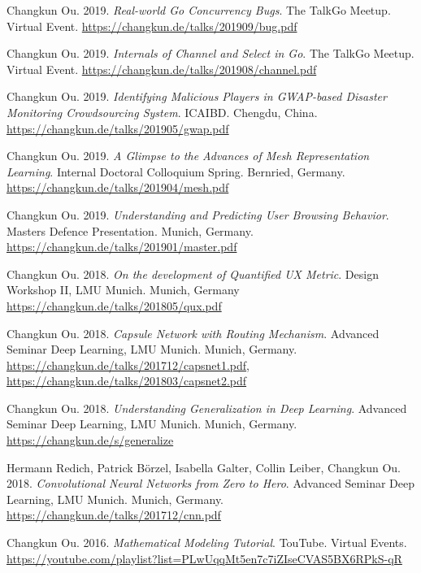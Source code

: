    \item{
      Changkun Ou. 2019.
      \emph{Real-world Go Concurrency Bugs}.
      The TalkGo Meetup. Virtual Event.
      \url{https://changkun.de/talks/201909/bug.pdf}
    }
    \item{
      Changkun Ou. 2019.
      \emph{Internals of Channel and Select in Go}.
      The TalkGo Meetup. Virtual Event.
      \url{https://changkun.de/talks/201908/channel.pdf}
    }
    \item{
      Changkun Ou. 2019.
      \emph{Identifying Malicious Players in GWAP-based Disaster Monitoring Crowdsourcing System}.
      ICAIBD. Chengdu, China.
      \url{https://changkun.de/talks/201905/gwap.pdf}
    }
    \item{
      Changkun Ou. 2019.
      \emph{A Glimpse to the Advances of Mesh Representation Learning}.
      Internal Doctoral Colloquium Spring. Bernried, Germany.
      \url{https://changkun.de/talks/201904/mesh.pdf}
    }
    \item{
      Changkun Ou. 2019.
      \emph{Understanding and Predicting User Browsing Behavior}.
      Masters Defence Presentation. Munich, Germany.
      \url{https://changkun.de/talks/201901/master.pdf}
    }
    \item{
      Changkun Ou. 2018.
      \emph{On the development of Quantified UX Metric}.
      Design Workshop II, LMU Munich. Munich, Germany
      \url{https://changkun.de/talks/201805/qux.pdf}
    }
    \item{
      Changkun Ou. 2018.
      \emph{Capsule Network with Routing Mechanism}.
      Advanced Seminar Deep Learning, LMU Munich. Munich, Germany.
      \url{https://changkun.de/talks/201712/capsnet1.pdf},
      \url{https://changkun.de/talks/201803/capsnet2.pdf}
    }
    \item{
      Changkun Ou. 2018.
      \emph{Understanding Generalization in Deep Learning}.
      Advanced Seminar Deep Learning, LMU Munich. Munich, Germany.
      \url{https://changkun.de/s/generalize}
    }
    \item{
      Hermann Redich, Patrick Börzel, Isabella Galter, Collin Leiber, Changkun Ou. 2018.
      \emph{Convolutional Neural Networks from Zero to Hero}.
      Advanced Seminar Deep Learning, LMU Munich. Munich, Germany.
      \url{https://changkun.de/talks/201712/cnn.pdf}
    }
    \item{
        Changkun Ou. 2016.
        \emph{Mathematical Modeling Tutorial}.
        TouTube. Virtual Events.
        \url{https://youtube.com/playlist?list=PLwUqqMt5en7c7iZIseCVAS5BX6RPkS-qR}
    }
\resumeSubHeadingListEnd
